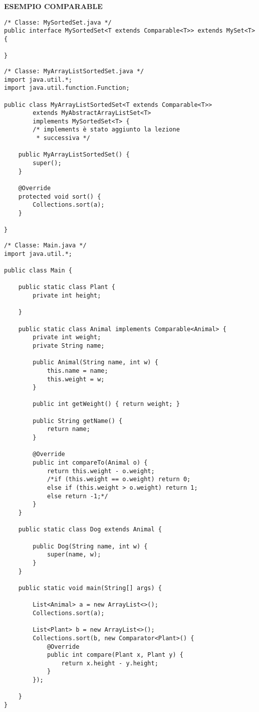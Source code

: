 \noindent \textbf{ESEMPIO COMPARABLE}
\begin{lstlisting}
/* Classe: MySortedSet.java */
public interface MySortedSet<T extends Comparable<T>> extends MySet<T> {

}
\end{lstlisting}

\begin{lstlisting}
/* Classe: MyArrayListSortedSet.java */
import java.util.*;
import java.util.function.Function;

public class MyArrayListSortedSet<T extends Comparable<T>>
        extends MyAbstractArrayListSet<T>
        implements MySortedSet<T> {
        /* implements è stato aggiunto la lezione
         * successiva */

    public MyArrayListSortedSet() {
        super();
    }

    @Override
    protected void sort() {
        Collections.sort(a);
    }

}
\end{lstlisting}

\begin{lstlisting}
/* Classe: Main.java */
import java.util.*;

public class Main {

    public static class Plant {
        private int height;

    }

    public static class Animal implements Comparable<Animal> {
        private int weight;
        private String name;

        public Animal(String name, int w) {
            this.name = name;
            this.weight = w;
        }

        public int getWeight() { return weight; }

        public String getName() {
            return name;
        }

        @Override
        public int compareTo(Animal o) {
            return this.weight - o.weight;
            /*if (this.weight == o.weight) return 0;
            else if (this.weight > o.weight) return 1;
            else return -1;*/
        }
    }

    public static class Dog extends Animal {

        public Dog(String name, int w) {
            super(name, w);
        }
    }

    public static void main(String[] args) {

        List<Animal> a = new ArrayList<>();
        Collections.sort(a);

        List<Plant> b = new ArrayList<>();
        Collections.sort(b, new Comparator<Plant>() {
            @Override
            public int compare(Plant x, Plant y) {
                return x.height - y.height;
            }
        });

    }
}
\end{lstlisting}